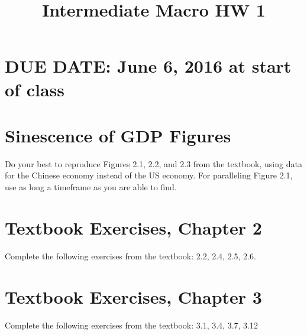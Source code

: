 \documentclass{article}
\begin{document}
\title{Intermediate Macro HW 1}

\maketitle

\section*{DUE DATE: June 6, 2016 at start of class}

\section{Sinescence of GDP Figures}

Do your best to reproduce Figures 2.1, 2.2, and 2.3 from the textbook, using data for the Chinese economy instead of the US economy. For paralleling Figure 2.1, use as long a timeframe as you are able to find.

\section{Textbook Exercises, Chapter 2}

Complete the following exercises from the textbook: 2.2, 2.4, 2.5, 2.6.

\section{Textbook Exercises, Chapter 3}

Complete the following exercises from the textbook: 3.1, 3.4, 3.7, 3.12
\end{document}
